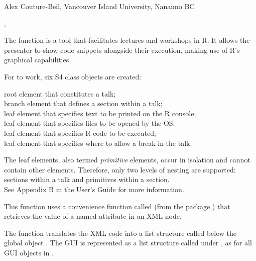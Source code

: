\documentclass[letterpaper]{book}
\begin{document}
%
\begin{Author}\relax
Alex Couture-Beil, Vancouver Island University, Nanaimo BC
\end{Author}
%
\begin{SeeAlso}\relax
{}, 
\end{SeeAlso}
%
\begin{Description}\relax
The function  is a tool that facilitates lectures and workshops in R.
It allows the presenter to show code snippets alongside their 
execution, making use of R's graphical capabilities. 

For  to work, six S4 class objects are created:

root element that constitutes a talk; \\{}
branch element that defines a section within a talk; \\{}
leaf element that specifies text to be printed on the R console; \\{}
leaf element that specifies files to be opened by the OS; \\{}
leaf element that specifies R code to be executed; \\{}
leaf element that specifies where to allow a break in the talk.

The leaf elements, also termed \emph{primitive} elements, occur in isolation and cannot
contain other elements. Therefore, only two levels of nesting are supported: sections 
within a talk and primitives within a section. \\{}
See Appendix B in the  User's Guide for more information.
\end{Description}
%
\begin{Details}\relax
This function uses a convenience function called 
(from the package ) that retrieves the value of a named attribute in an XML node.

The function  translates the XML code into a list structure 
called  below the global object . The GUI is 
represented as a list structure called  under , 
as for all GUI objects in .
\end{Details}
\end{document}
